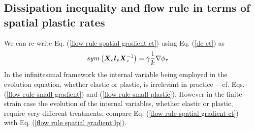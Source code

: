 \documentclass[preprint,review,12pt,sort&compress]{elsarticle}%
\renewcommand{\mathbf}[1]{\mbox{\boldmath $#1$ \unboldmath}  \!\!}
\begin{document}
\subsection{Dissipation inequality and flow rule in terms of spatial plastic
rates}

We can re-write Eq. (\ref{flow rule spatial gradient ct}) using Eq.
(\ref{de ct}) as%
\begin{equation}
sym\left(  \mathbf{X}_{e}\mathbf{l}_{p}\mathbf{X}_{e}^{-1}\right)
=\dot{\gamma}\frac{1}{k}\nabla\phi_{\tau}
\label{flow rule spatial gradient lp}%
\end{equation}
In the infinitesimal framework the internal variable being employed in the
evolution equation, whether elastic or plastic, is irrelevant in practice
---cf. Eqs. (\ref{flow rule small gradient}) and
(\ref{flow rule small plastic}). However in the finite strain case the
evolution of the internal variables, whether elastic or plastic, require very
different treatments, compare Eq. (\ref{flow rule spatial gradient ct}) with
Eq. (\ref{flow rule spatial gradient lp}).
\end{document}
